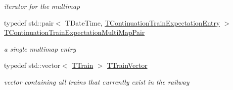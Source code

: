 \begin{DoxyCompactItemize}
\begin{DoxyCompactList}\small\item\em iterator for the multimap \end{DoxyCompactList}\item 
\mbox{\label{class_t_train_controller_a5adc75543948ea32915ef025ace798b2}} 
typedef std\+::pair$<$ T\+Date\+Time, \mbox{\hyperlink{class_t_train_controller_1_1_t_continuation_train_expectation_entry}{T\+Continuation\+Train\+Expectation\+Entry}} $>$ \mbox{\hyperlink{class_t_train_controller_a5adc75543948ea32915ef025ace798b2}{T\+Continuation\+Train\+Expectation\+Multi\+Map\+Pair}}
\begin{DoxyCompactList}\small\item\em a single multimap entry \end{DoxyCompactList}\item 
\mbox{\label{class_t_train_controller_aa9073b97736a2733dbdaf8dc52e34c24}} 
typedef std\+::vector$<$ \mbox{\hyperlink{class_t_train}{T\+Train}} $>$ \mbox{\hyperlink{class_t_train_controller_aa9073b97736a2733dbdaf8dc52e34c24}{T\+Train\+Vector}}
\begin{DoxyCompactList}\small\item\em vector containing all trains that currently exist in the railway \end{DoxyCompactList}\end{DoxyCompactItemize}
